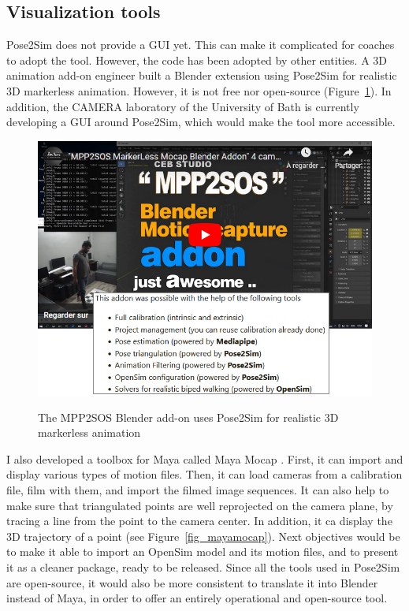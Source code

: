 \clearpage

\subsection{Visualization tools}

Pose2Sim does not provide a GUI yet. This can make it complicated for coaches to adopt the tool. However, the code has been adopted by other entities. A 3D animation add-on engineer built a Blender \cite{Blender1998} extension using Pose2Sim for realistic 3D markerless animation. However, it is not free nor open-source \cite{Barreto2022} (Figure~\ref{fig_mpp2sos}). In addition, the CAMERA laboratory of the University of Bath is currently developing a GUI around Pose2Sim, which would make the tool more accessible. 

\begin{figure}[hbtp]
      \centering
      \def\svgwidth{1\columnwidth}
      \fontsize{10pt}{10pt}\selectfont
      \href{https://blendermarket.com/products/mocap-mpp2soss}{
            \includegraphics[width=\linewidth]{"../Chap3/Figures/MPP2SOS.png"}
      }
      \caption{The MPP2SOS Blender add-on uses Pose2Sim for realistic 3D markerless animation}
      \label{fig_mpp2sos}
\end{figure}

I also developed a toolbox for Maya \cite{Maya1998} called Maya Mocap \cite{Pagnon2020}. First, it can import and display various types of motion files. Then, it can load cameras from a calibration file, film with them, and import the filmed image sequences. It can also help to make sure that triangulated points are well reprojected on the camera plane, by tracing a line from the point to the camera center. In addition, it ca display the 3D trajectory of a point (see Figure~\ref{fig_mayamocap}). Next objectives would be to make it able to import an OpenSim model and its motion files, and to present it as a cleaner package, ready to be released. Since all the tools used in Pose2Sim are open-source, it would also be more consistent to translate it into Blender instead of Maya, in order to offer an entirely operational and open-source tool.


